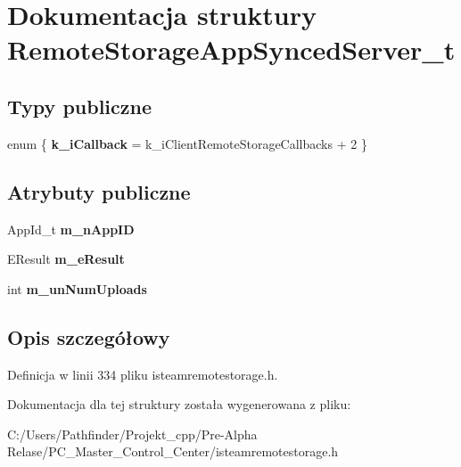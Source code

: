 \hypertarget{struct_remote_storage_app_synced_server__t}{}\section{Dokumentacja struktury Remote\+Storage\+App\+Synced\+Server\+\_\+t}
\label{struct_remote_storage_app_synced_server__t}
\subsection*{Typy publiczne}
\begin{DoxyCompactItemize}
\item 
\mbox{\label{struct_remote_storage_app_synced_server__t_a4413eba1b21f4780dcdea31d6505233b}} 
enum \{ {\bfseries k\+\_\+i\+Callback} = k\+\_\+i\+Client\+Remote\+Storage\+Callbacks + 2
 \}
\end{DoxyCompactItemize}
\subsection*{Atrybuty publiczne}
\begin{DoxyCompactItemize}
\item 
\mbox{\label{struct_remote_storage_app_synced_server__t_ad8fc7b2e71a87d55da5c3cf6a361808e}} 
App\+Id\+\_\+t {\bfseries m\+\_\+n\+App\+ID}
\item 
\mbox{\label{struct_remote_storage_app_synced_server__t_a18d51136d61e5963cf44ae6fde021f59}} 
E\+Result {\bfseries m\+\_\+e\+Result}
\item 
\mbox{\label{struct_remote_storage_app_synced_server__t_ac6ba06790bf95368ec6a4a988b14b8cb}} 
int {\bfseries m\+\_\+un\+Num\+Uploads}
\end{DoxyCompactItemize}


\subsection{Opis szczegółowy}


Definicja w linii 334 pliku isteamremotestorage.\+h.



Dokumentacja dla tej struktury została wygenerowana z pliku\+:\begin{DoxyCompactItemize}
\item 
C\+:/\+Users/\+Pathfinder/\+Projekt\+\_\+cpp/\+Pre-\/\+Alpha Relase/\+P\+C\+\_\+\+Master\+\_\+\+Control\+\_\+\+Center/isteamremotestorage.\+h\end{DoxyCompactItemize}
